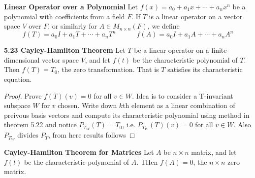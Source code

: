 \documentclass[11pt]{article}
\begin{document}
\begin{defn*}
    \textbf{Linear Operator over a Polynomial} Let $f(x) = a_0 + a_1 x + \cdots + a_n x^n$ be a polynomial with coefficients from a field $F$. If $T$ is a linear operator on a vector space $V$ over $F$, or similarly for $A\in M_{n\times n}(F)$, we define 
    \[
        f(T) = a_0I + a_1 T + \cdots + a_n T^n    
        \quad \quad \quad 
        f(A) = a_0I + a_1 A + \cdots + a_n A^n
    \]
\end{defn*}

\begin{theorem*}
    \textbf{5.23 Cayley-Hamilton Theorem} Let $T$ be a linear operator on a finite-dimensional vector space $V$, and let $f(t)$ be the characteristic polynomial of $T$. Then $f(T) = T_0$, the zero transformation. That is $T$ satisfies its characteristic equation.  
    \begin{proof}
        Prove $f(T)(v)=0$ for all $v\in W$. Idea is to consider a T-invariant subspace $W$ for $v$ chosen. Write down $k$th element as a linear combination of preivous basis vectors and compute its characteristic polynomial using method in theorem 5.22 and notice $P_{T_W}(T) = T_0$, i.e. $P_{T_W}(T)(v) = 0$ for all $v\in W$. Also $P_{T_W}$ divides $P_{T}$, from here results follows
    \end{proof}
\end{theorem*}

\begin{corollary*}
    \textbf{Cayley-Hamilton Theorem for Matrices} Let $A$ be $n\times n$ matrix, and let $f(t)$ be the characteristic polynomial of $A$. THen $f(A) = 0$, the $n\times n$ zero matrix.
\end{corollary*}
\end{document}
